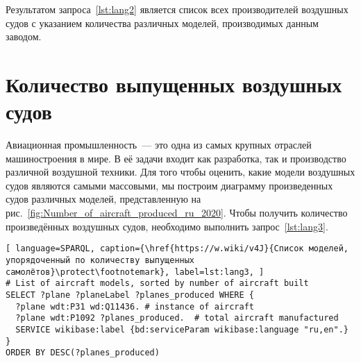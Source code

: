 
Результатом запроса~\ref{lst:lang2} является список всех производителей воздушных судов с указанием количества различных моделей, производимых данным заводом.

\section{Количество выпущенных воздушных судов}

Авиационная промышленность~--- это одна из самых крупных отраслей машиностроения в мире. 
В её задачи входит как разработка, так и производство различной воздушной техники. 
Для того чтобы оценить, какие модели воздушных судов являются самыми массовыми, 
мы построим диаграмму произведенных судов различных моделей, представленную на рис.~\ref{fig:Number_of_aircraft_produced_ru_2020}. 
Чтобы получить количество произведённых воздушных судов, необходимо выполнить запрос~\ref{lst:lang3}.

\begin{lstlisting}[ language=SPARQL, caption={\href{https://w.wiki/v4J}{Список моделей, упорядоченный по количеству выпущенных самолётов}\protect\footnotemark}, label=lst:lang3, ]
# List of aircraft models, sorted by number of aircraft built
SELECT ?plane ?planeLabel ?planes_produced WHERE {
  ?plane wdt:P31 wd:Q11436. # instance of aircraft
  ?plane wdt:P1092 ?planes_produced.  # total aircraft manufactured
  SERVICE wikibase:label {bd:serviceParam wikibase:language "ru,en".}
}
ORDER BY DESC(?planes_produced)
\end{lstlisting}

